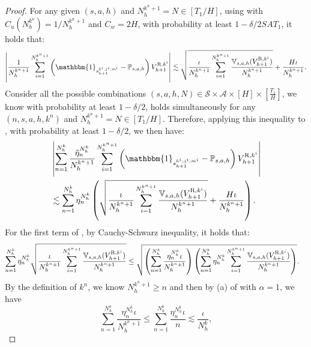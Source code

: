 \documentclass{article}
\newcommand{\R}{\textnormal{R}}
\begin{document}
\begin{proof}
    For any given $(s,a,h)$ and $N_h^{k^n+1} = N \in [T_1/H]$, using  with $C_u(N_h^{k^n}) = 1 / N_h^{k^n+1}$ and $C_w = 2H$, with probability at least $1-\delta / 2SAT_1$, it holds that:
    \begin{align}
    \label{knbound}
        \left|\frac{1} {N_h^{k^n+1}}\sum_{i=1}^{N_h^{k^n+1}}\left(\mathbbm{1}_{s_{h+1}^{k^i,j^i,m^i}}-\mathbb{P}_{s,a,h}\right)V_{h+1}^{\R,k^i}\right| \lesssim \sqrt{\frac{\iota}{N_h^{k^n+1}}\sum_{i=1}^{N_h^{k^n+1}}\frac{\mathbb{V}_{s,a,h}(V_{h+1}^{\R,k^i})}{N_h^{k^n+1}}} + \frac{H\iota}{N_h^{k^n+1}}.
    \end{align}
    Consider all the possible combinations $(s,a,h,N) \in \mathcal{S} \times \mathcal{A} \times [H] \times [\frac{T_1}{H}]$, we know with probability at least $1-\delta/2$,  holds simultaneously for any $(n,s,a,h,k^n)$ and $N_h^{k^n+1} = N\in [T_1/H]$. Therefore, applying this inequality to , with probability at least $1-\delta/2$, we then have:
    \begin{align}
    \label{refpossitivemiddle}
        &\left|\sum_{n=1}^{N_h^k} \frac{\Tilde{\eta}_n^{N_h^k}} {N_h^{k^n+1}}\sum_{i=1}^{N_h^{k^n+1}}\left(\mathbbm{1}_{s_{h+1}^{k^i,j^i,m^i}}-\mathbb{P}_{s,a,h}\right)V_{h+1}^{\R,k^i}\right| \nonumber\\
        &\lesssim \sum_{n=1}^{N_h^k} \eta_n^{N_h^k} \left(\sqrt{\frac{\iota}{N_h^{k^n+1}}\sum_{i=1}^{N_h^{k^n+1}}\frac{\mathbb{V}_{s,a,h}(V_{h+1}^{\R,k^i})}{N_h^{k^n+1}}} + \frac{H\iota}{N_h^{k^n+1}}\right).
    \end{align}
    For the first term of , by Cauchy-Schwarz inequality, it holds that:
    \begin{align}
    \label{refmiddle1}
        \sum_{n=1}^{N_h^k} \eta_n^{N_h^k} \sqrt{\frac{\iota}{N_h^{k^n+1}}\sum_{i=1}^{N_h^{k^n+1}}\frac{\mathbb{V}_{s,a,h}(V_{h+1}^{\R,k^i})}{N_h^{k^n+1}}} &\leq 
        \sqrt{\left(\sum_{n=1}^{N_h^k}\frac{\eta_n^{N_h^k}\iota}{N_h^{k^n+1}}\right) \left(\sum_{n=1}^{N_h^k}\eta_n^{N_h^k}\sum_{i=1}^{N_h^{k^n+1}}\frac{\mathbb{V}_{s,a,h}(V_{h+1}^{\R,k^i})}{N_h^{k^n+1}}\right)}.
    \end{align}
    By the definition of $k^n$, we know $N_h^{k^n+1} \geq n$ and then by (a) of  with $\alpha = 1$, we have
    \begin{equation}
    \label{b21}
        \sum_{n=1}^{N_h^k}\frac{\eta_n^{N_h^k}\iota}{N_h^{k^n+1}} \leq \sum_{n=1}^{N_h^k}\frac{\eta_n^{N_h^k}\iota}{n} \lesssim \frac{\iota}{N_h^k},
    \end{equation}

\end{proof}
\end{document}

